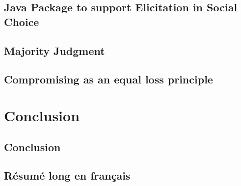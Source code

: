 \documentclass[a4paper, 11pt,oneside]{book}
\begin{document}
	\chapter{Java Package to support Elicitation in Social Choice}
		\label{ch:uml}
		
	\chapter{Majority Judgment}
		\label{ch:MJ}
		

	\chapter{Compromising as an equal loss principle}
	\label{ch:compromise}
		

\part{Conclusion}
	\chapter{Conclusion}
		\label{ch:conclusion}
		




\backmatter
{}



 

\chapter{Résumé long en français}

\end{document}
